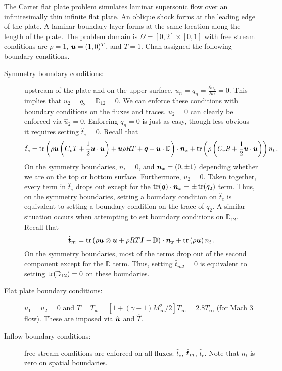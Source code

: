 \documentclass[Proposal.tex]{subfiles}
\begin{document}
The Carter flat plate problem simulates laminar supersonic flow over an infinitesimally thin infinite flat plate.
An oblique shock forms at the leading edge of the plate. 
A laminar boundary layer forms at the same location along the length of the plate.
The problem domain is $\Omega=[0,2]\times[0,1]$
with free stream conditions are $\rho=1$, $\boldsymbol u=(1,0)^T$, and $T=1$.
Chan assigned the following boundary conditions.
\begin{description}
	\item[Symmetry boundary conditions:] upstream of the plate and on the upper surface, $u_n=q_n=\frac{\partial u_s}{\partial n}=0$.
	This implies that $u_2=q_2=\mathbb{D}_{12}=0$. 
	We can enforce these conditions with boundary conditions on the fluxes and traces. $u_2=0$ can clearly be enforced via $\hat u_2=0$.
	Enforcing $q_n=0$ is just as easy, though less obvious - it requires setting $\hat t_e=0$.
	Recall that 
	\begin{equation*}
	\hat t_e=\operatorname*{tr}\left( \rho\boldsymbol u\left( C_v T+\frac{1}{2}\boldsymbol u\cdot\boldsymbol u \right)+\boldsymbol u\rho RT+\boldsymbol q-\boldsymbol u\cdot\mathbb{D} \right)\cdot\boldsymbol n_x
	+\operatorname*{tr}\left( \rho\left( C_v R+\frac{1}{2}\boldsymbol u\cdot\boldsymbol u \right) \right)n_t\,.
	\end{equation*}
	On the symmetry boundaries, $n_t=0$, and $\boldsymbol n_x=(0,\pm1)$ depending whether we are on the top or bottom surface. 
	Furthermore, $u_2=0$. Taken together, every term in $\hat t_e$ drops out except for the $\operatorname*{tr}(\boldsymbol q)\cdot\boldsymbol n_x=\pm\operatorname*{tr}(q_2)$ term.
	Thus, on the symmetry boundaries, setting a boundary condition on $\hat t_e$ is equivalent to setting a boundary condition on the trace of $q_2$.
	A similar situation occurs when attempting to set boundary conditions on $\mathbb{D}_{12}$. Recall that
	\begin{equation*}
	\hat{\boldsymbol t}_m=\operatorname*{tr}\left( \rho\boldsymbol u\otimes\boldsymbol u+\rho RT\boldsymbol I-\mathbb{D} \right)\cdot\boldsymbol n_x
	+\operatorname*{tr}\left( \rho\boldsymbol u \right) n_t\,.
	\end{equation*}
	On the symmetry boundaries, most of the terms drop out of the second component except for the $\mathbb{D}$ term.
	Thus, setting $\hat t_{m2}=0$ is equivalent to setting $\operatorname*{tr}(\mathbb{D}_{12})=0$ on these boundaries.
	\item[Flat plate boundary conditions:] $u_1=u_2=0$ and $T=T_w=[1+(\gamma-1)M_\infty^2/2]T_\infty=2.8T_\infty$ (for Mach 3 flow).
	These are imposed via $\hat{\boldsymbol u}$ and $\hat T$.
	\item[Inflow boundary conditions:] free stream conditions are enforced on all fluxes: $\hat t_e$, $\hat{\boldsymbol t}_m$, $\hat t_e$. 
	Note that $n_t$ is zero on spatial boundaries.

\end{description}
\end{document}

